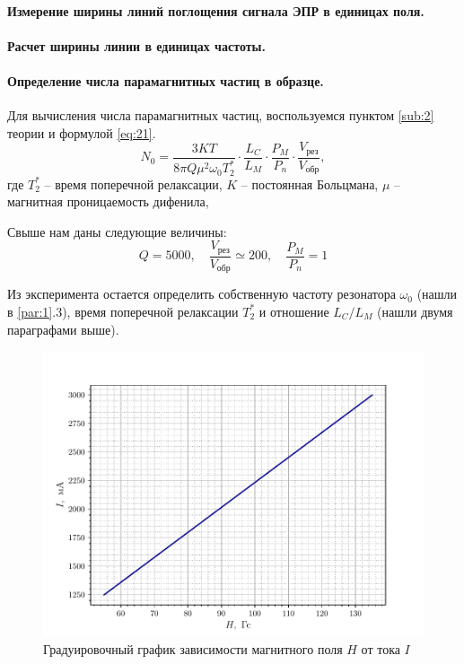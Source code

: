 \paragraph{Измерение ширины линий поглощения сигнала ЭПР в единицах поля.}%


\paragraph{Расчет ширины линии в единицах частоты.}

\paragraph{Определение числа парамагнитных частиц в образце.}%
Для вычисления числа парамагнитных частиц, воспользуемся пунктом \ref{sub:2} теории и формулой \eqref{eq:21}.
\begin{equation}
    \label{eq:21a}
    N_0 = \frac{3KT}{8 \pi Q \mu^2 \omega_0 T^*_2} \cdot \frac{L_C}{L_M} \cdot \frac{P_M}{P_n} \cdot \frac{V_{\text{рез}}}{V_{\text{обр}}},
\end{equation}
где $T_2^*$ -- время поперечной релаксации,  $K$ -- постоянная Больцмана,  $\mu$ -- магнитная проницаемость дифенила,

Свыше нам даны следующие величины:
\begin{equation}
    \label{eq:}
    Q = 5000, \quad \frac{V_{\text{рез}}}{V_{\text{обр}}} \simeq 200, \quad \frac{P_M}{P_n} = 1
\end{equation}

Из эксперимента остается определить собственную частоту резонатора $\omega_{0}$ (нашли в \ref{par:1}.3), время поперечной релаксации $T^*_2$ и отношение  $L_C / L_M$ (нашли двумя параграфами выше). 

\begin{figure}[h!]
    \centering
    \includegraphics[scale=1]{fig/fig1}
    \caption{Градуировочный график зависимости магнитного поля $H$ от тока $I$}
    \label{fig:1}
\end{figure}

